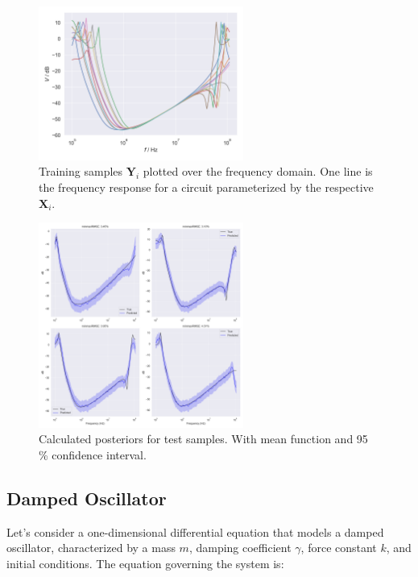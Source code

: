 \documentclass{article}
\begin{document}
\begin{figure}[htbp!]
    \centering
    \includegraphics[width=0.6\textwidth]{plots/data_samples.png}
    \caption{Training samples $\bm Y_i$ plotted over the frequency domain. One line is the frequency response for a circuit parameterized by the respective $\bm X_i$.}
    \label{fig:training_samples}
\end{figure}
\begin{figure}[htbp!]
    \centering
    \includegraphics[width=0.6\textwidth]{plots/prediction_transformer.png}
    \caption{Calculated posteriors for test samples. With mean function and 95 \% confidence interval.}
    \label{fig:training_samples}
\end{figure}
\subsection{Damped Oscillator}
Let's consider a one-dimensional differential equation that models a damped oscillator, characterized by a mass $ m $, damping coefficient $ \gamma $, force constant $k$, and initial conditions. The equation governing the system is:
\end{document}

